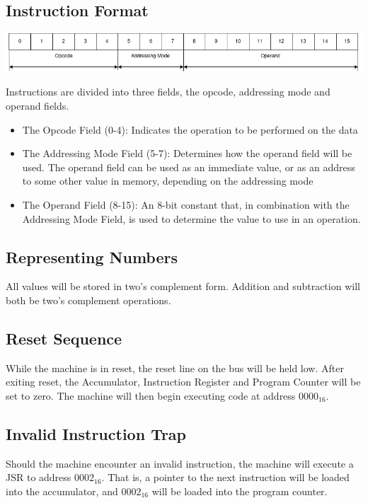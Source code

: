 \documentclass[11pt]{article}
\begin{document}
    \subsection{Instruction Format}\label{subsec:instruction-format}
    \begin{center}
        \includegraphics[scale=0.40]{img/Instruction_Format}
    \end{center}
    \par Instructions are divided into three fields, the opcode, addressing mode and operand fields.
    \begin{itemize}
        \item The Opcode Field (0-4): Indicates the operation to be performed on the data
        \item The Addressing Mode Field (5-7): Determines how the operand field will be used.
        The operand field can be used as an immediate value, or as an address to some other value in memory,
        depending on the addressing mode
        \item The Operand Field (8-15): An 8-bit constant that, in combination with the Addressing Mode Field, is
        used to determine the value to use in an operation.
    \end{itemize}

    \subsection{Representing Numbers}\label{subsec:representing-numbers}
    \par All values will be stored in two's complement form.
    Addition and subtraction will both be two's complement operations.


    \subsection{Reset Sequence}\label{subsec:reset-sequence}
    \par While the machine is in reset, the reset line on the bus will be held low.
    After exiting reset, the Accumulator, Instruction Register and Program Counter will
    be set to zero.
    The machine will then begin executing code at address $0000_{16}$.


    \subsection{Invalid Instruction Trap}\label{subsec:invalid-instruction-trap}
    \par Should the machine encounter an invalid instruction, the machine will execute a JSR to address $0002_{16}$.
    That is, a pointer to the next instruction will be loaded into the accumulator, and $0002_{16}$ will be loaded
    into the program counter.
    \pagebreak
\end{document}
